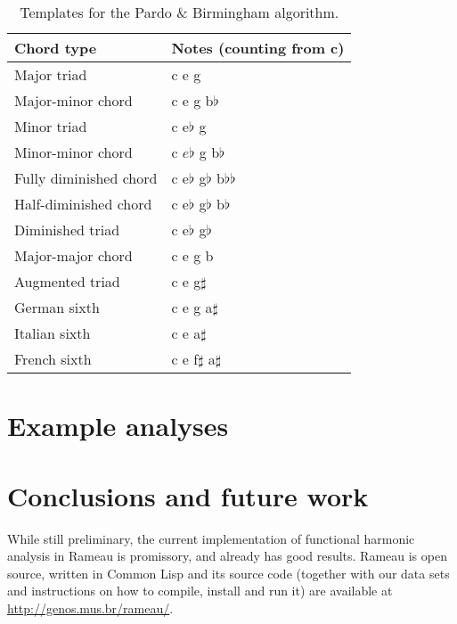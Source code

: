 \begin{table}[h]
  \centering
  \begin{small}
    \begin{sc}
      \begin{tabular}[t]{ll} \hline
        Chord type & Notes (counting from c) \\ \hline
        Major triad & c e g \\
        Major-minor chord &  c e g b$\flat$ \\
        Minor triad & c e$\flat$ g \\
        Minor-minor chord & c $e\flat$ g b$\flat$ \\
        Fully diminished chord & c e$\flat$ g$\flat$ b$\flat\flat$ \\
        Half-diminished chord & c e$\flat$ g$\flat$ b$\flat$ \\
        Diminished triad & c e$\flat$ g$\flat$ \\
        Major-major chord & c e g b \\
        Augmented triad & c e g$\sharp$ \\
        German sixth  & c e g a$\sharp$ \\
        Italian sixth & c e a$\sharp$ \\
        French sixth & c e f$\sharp$ a$\sharp$ \\ \hline
      \end{tabular}
    \end{sc}
  \end{small}
  \caption{Templates for the Pardo \& Birmingham algorithm.}
  \label{tab:templates-pardo}
\end{table}

\section{Example analyses}
\label{sec:example-analyses}

\section{Conclusions and future work}
\label{sec:concl-future-work}

While still preliminary, the current implementation of functional
harmonic analysis in Rameau is promissory, and already has good
results. Rameau is open source, written in Common Lisp and its source
code (together with our data sets and instructions on how to compile,
install and run it) are available at
\url{http://genos.mus.br/rameau/}.

